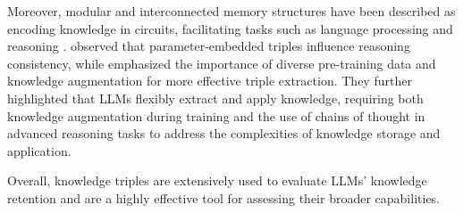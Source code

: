 Moreover, modular and interconnected memory structures have been described as encoding knowledge in circuits, facilitating tasks such as language processing and reasoning \cite{DBLP:conf/emnlp/WangYXQD00GJX0C24}. \citet{DBLP:conf/acl/JuCY0DZL24} observed that parameter-embedded triples influence reasoning consistency, while \citet{DBLP:conf/icml/Allen-ZhuL24} emphasized the importance of diverse pre-training data and knowledge augmentation for more effective triple extraction. They further highlighted that LLMs flexibly extract and apply knowledge, requiring both knowledge augmentation during training and the use of chains of thought in advanced reasoning tasks to address the complexities of knowledge storage and application.

Overall, knowledge triples are extensively used to evaluate LLMs’ knowledge retention and are a highly effective tool for assessing their broader capabilities.
